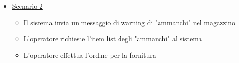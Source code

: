 \begin{enumerate}
\begin{itemize}
\begin{itemize}
            \item \uline{Scenario 2}
            \begin{itemize}
                \item Il sistema invia un messaggio di warning di "ammanchi" nel magazzino
                \item L'operatore richieste l'item list degli "ammanchi" al sistema 
                \item L'operatore effettua l'ordine per la fornitura
            \end{itemize}
        \end{itemize}
    \end{itemize} 
\end{enumerate}
